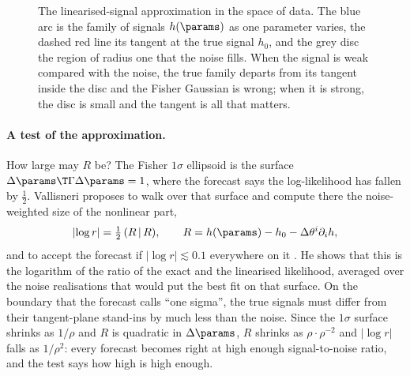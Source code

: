 \begin{figure}[htbp]
\centering
{}
\caption{The linearised-signal approximation in the space of data. The blue arc is the family of signals $h(\params)$ as
one parameter varies, the dashed red line its tangent at the true signal $h_0$, and the grey disc the region of radius
one that the noise fills. When the signal is weak compared with the noise, the true family departs from its tangent
inside the disc and the Fisher Gaussian is wrong; when it is strong, the disc is small and the tangent is all that
matters.}
\label{10b:fig:manifold}
\end{figure}

\paragraph{A test of the approximation.} How large may $R$ be? The Fisher $1\sigma$ ellipsoid is the surface
$\Delta\params\T\Gamma\Delta\params=1$, where the forecast says the log-likelihood has fallen by $\tfrac12$. Vallisneri
proposes to walk over that surface and compute there the noise-weighted size of the nonlinear part,
\begin{equation}
  \lvert\log r\rvert=\tfrac12\,(R\,|\,R),\qquad R=h(\params)-h_0-\Delta\theta^i\partial_ih,
  \label{10b:eq:logr}
\end{equation}
and to accept the forecast if $\lvert\log r\rvert\lesssim0.1$ everywhere on it \cite[eq.~(47)]{Vallisneri2008}. He shows that
this is the logarithm of the ratio of the exact and the linearised likelihood, averaged over the noise realisations
that would put the best fit on that surface. On the boundary that the forecast calls ``one sigma'', the
true signals must differ from their tangent-plane stand-ins by much less than the noise. Since the $1\sigma$ surface
shrinks as $1/\rho$ and $R$ is quadratic in $\Delta\params$, $R$ shrinks as $\rho\cdot\rho^{-2}$ and $\lvert\log r\rvert$ falls as
$1/\rho^2$: every forecast becomes right at high enough signal-to-noise ratio, and the test says how high is high
enough.

